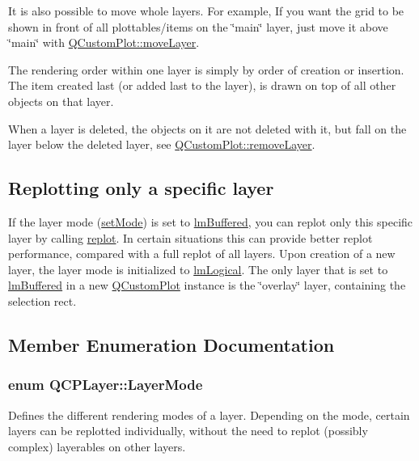 It is also possible to move whole layers. For example, If you want the grid to be shown in front of all plottables/items on the \char`\"{}main\char`\"{} layer, just move it above \char`\"{}main\char`\"{} with \hyperlink{classQCustomPlot_ae896140beff19424e9e9e02d6e331104}{Q\+Custom\+Plot\+::move\+Layer}.

The rendering order within one layer is simply by order of creation or insertion. The item created last (or added last to the layer), is drawn on top of all other objects on that layer.

When a layer is deleted, the objects on it are not deleted with it, but fall on the layer below the deleted layer, see \hyperlink{classQCustomPlot_a40f75e342c5eaab6a86066a42a0e2a94}{Q\+Custom\+Plot\+::remove\+Layer}.\hypertarget{classQCPLayer_qcplayer-buffering}{}\subsection{Replotting only a specific layer}\label{classQCPLayer_qcplayer-buffering}
If the layer mode (\hyperlink{classQCPLayer_a938d57b04f4e4c23cedf1711f983919b}{set\+Mode}) is set to \hyperlink{classQCPLayer_a67dcfc1590be2a1f2227c5a39bb59c7cab581b9fab3007c4c65f057f4185d7538}{lm\+Buffered}, you can replot only this specific layer by calling \hyperlink{classQCPLayer_adefd53b6db02f470151c416f42e37180}{replot}. In certain situations this can provide better replot performance, compared with a full replot of all layers. Upon creation of a new layer, the layer mode is initialized to \hyperlink{classQCPLayer_a67dcfc1590be2a1f2227c5a39bb59c7ca02eb5e9a4cb7f1baf1e2b6b99e3b87ce}{lm\+Logical}. The only layer that is set to \hyperlink{classQCPLayer_a67dcfc1590be2a1f2227c5a39bb59c7cab581b9fab3007c4c65f057f4185d7538}{lm\+Buffered} in a new \hyperlink{classQCustomPlot}{Q\+Custom\+Plot} instance is the \char`\"{}overlay\char`\"{} layer, containing the selection rect. 

\subsection{Member Enumeration Documentation}
\subsubsection[{\texorpdfstring{Layer\+Mode}{LayerMode}}]{\setlength{\rightskip}{0pt plus 5cm}enum {\bf Q\+C\+P\+Layer\+::\+Layer\+Mode}}\hypertarget{classQCPLayer_a67dcfc1590be2a1f2227c5a39bb59c7c}{}\label{classQCPLayer_a67dcfc1590be2a1f2227c5a39bb59c7c}
Defines the different rendering modes of a layer. Depending on the mode, certain layers can be replotted individually, without the need to replot (possibly complex) layerables on other layers.

